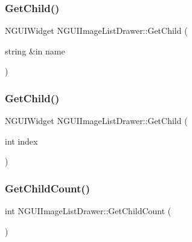 \subsubsection{\texorpdfstring{Get\+Child()}{GetChild()}\hspace{0.1cm}{\footnotesize\ttfamily [1/2]}}
{\footnotesize\ttfamily N\+G\+U\+I\+Widget N\+G\+U\+I\+Image\+List\+Drawer\+::\+Get\+Child (\begin{DoxyParamCaption}\item[{string \&in}]{name }\end{DoxyParamCaption})}

\hypertarget{class_n_g_u_i_image_list_drawer_aa320229e78fabe1dff8c8900511ea685}{}\label{class_n_g_u_i_image_list_drawer_aa320229e78fabe1dff8c8900511ea685} 
\subsubsection{\texorpdfstring{Get\+Child()}{GetChild()}\hspace{0.1cm}{\footnotesize\ttfamily [2/2]}}
{\footnotesize\ttfamily N\+G\+U\+I\+Widget N\+G\+U\+I\+Image\+List\+Drawer\+::\+Get\+Child (\begin{DoxyParamCaption}\item[{int}]{index }\end{DoxyParamCaption})}

\hypertarget{class_n_g_u_i_image_list_drawer_a431fa4b53ed6f4b30acc275d00e66a0e}{}\label{class_n_g_u_i_image_list_drawer_a431fa4b53ed6f4b30acc275d00e66a0e} 
\subsubsection{\texorpdfstring{Get\+Child\+Count()}{GetChildCount()}}
{\footnotesize\ttfamily int N\+G\+U\+I\+Image\+List\+Drawer\+::\+Get\+Child\+Count (\begin{DoxyParamCaption}{ }\end{DoxyParamCaption})}

\hypertarget{class_n_g_u_i_image_list_drawer_aa972c7a5f39aa4291b0d775471e6e1eb}{}\label{class_n_g_u_i_image_list_drawer_aa972c7a5f39aa4291b0d775471e6e1eb} 
